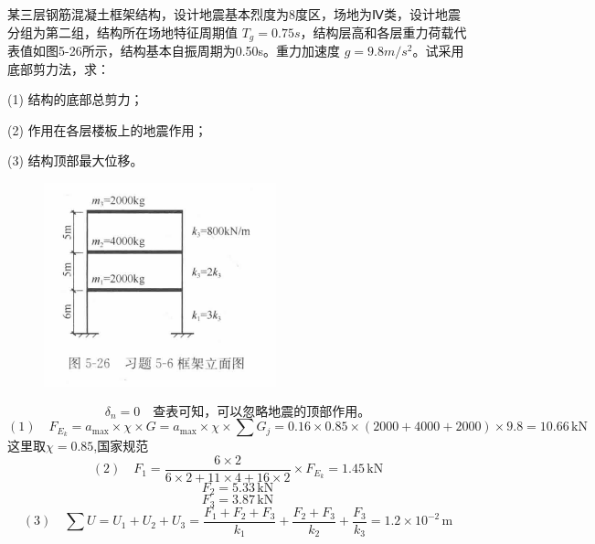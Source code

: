 \documentclass[12pt, a4paper, oneside, UTF8]{ctexbook}
\begin{document}
\begin{example}
某三层钢筋混凝土框架结构，设计地震基本烈度为8度区，场地为Ⅳ类，设计地震分组为第二组，结构所在场地特征周期值 \(T_g = 0.75s\)，结构层高和各层重力荷载代表值如图5-26所示，结构基本自振周期为0.50s。重力加速度 \(g = 9.8m/s^2\)。试采用底部剪力法，求：

(1) 结构的底部总剪力；

(2) 作用在各层楼板上的地震作用；

(3) 结构顶部最大位移。

\begin{figure}[H]
    \centering
    \includegraphics[width=0.6\textwidth]{../figure/4.png}
\end{figure}

    \[
    \delta_n = 0 \quad \text{查表可知，可以忽略地震的顶部作用。}
    \]
    \[
    (1)\quad F_{E_k} = a_{\max} \times \chi \times G = a_{\max} \times \chi \times \sum G_j = 0.16 \times 0.85 \times (2000 + 4000 + 2000) \times 9.8 = 10.66\,\text{kN}
    \]
    这里取$\chi = 0.85$,国家规范
    \[
    (2)\quad F_1 = \frac{6 \times 2}{6 \times 2 + 11 \times 4 + 16 \times 2} \times F_{E_k} = 1.45\,\text{kN}
    \]
    \[
    F_2 = 5.33\,\text{kN}
    \]
    \[
    F_3 = 3.87\,\text{kN}
    \]
    \[
    (3)\quad \sum U = U_1 + U_2 + U_3 = \frac{F_1 + F_2 + F_3}{k_1} + \frac{F_2 + F_3}{k_2} + \frac{F_3}{k_3} = 1.2 \times 10^{-2}\,\text{m}
    \]
\end{example}


\ifx\allfiles\undefined
\end{document}
